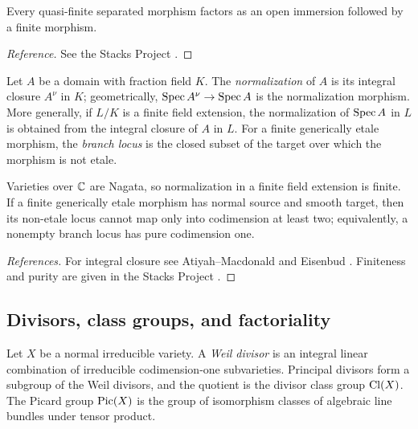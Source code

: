 \begin{recalledtheorem}\label{thm:zariski-main}
Every quasi-finite separated morphism factors as an open immersion followed by a finite morphism.
\end{recalledtheorem}

\begin{proof}[Reference]
See the Stacks Project \cite[Tag 02LQ]{StacksProject}.
\end{proof}

\begin{definition}\label{def:normalization}
Let $A$ be a domain with fraction field $K$.  The \emph{normalization} of $A$ is its integral closure $A^{\nu}$ in $K$; geometrically, $\operatorname{Spec} A^{\nu}\to\operatorname{Spec} A$ is the normalization morphism.  More generally, if $L/K$ is a finite field extension, the normalization of $\operatorname{Spec} A$ in $L$ is obtained from the integral closure of $A$ in $L$.  For a finite generically etale morphism, the \emph{branch locus} is the closed subset of the target over which the morphism is not etale.
\end{definition}

\begin{recalledtheorem}\label{thm:normalization-purity}
Varieties over $\mathbb C$ are Nagata, so normalization in a finite field extension is finite.  If a finite generically etale morphism has normal source and smooth target, then its non-etale locus cannot map only into codimension at least two; equivalently, a nonempty branch locus has pure codimension one.
\end{recalledtheorem}

\begin{proof}[References]
For integral closure see Atiyah--Macdonald \cite[Chapter 5]{AtiyahMacdonald} and Eisenbud \cite[Chapter 4]{Eisenbud1995}.  Finiteness and purity are given in the Stacks Project \cite[Tags 035S, 0BXQ, and 0BJE]{StacksProject}.
\end{proof}

\subsection{Divisors, class groups, and factoriality}

\begin{definition}\label{def:divisors-class-pic}
Let $X$ be a normal irreducible variety.  A \emph{Weil divisor} is an integral linear combination of irreducible codimension-one subvarieties.  Principal divisors form a subgroup of the Weil divisors, and the quotient is the divisor class group $\operatorname{Cl}(X)$.  The Picard group $\operatorname{Pic}(X)$ is the group of isomorphism classes of algebraic line bundles under tensor product.
\end{definition}


